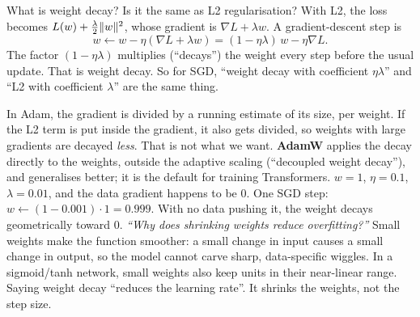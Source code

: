 \begin{qa}{ What is weight decay? Is it the same as L2 regularisation?}
\why
With L2, the loss becomes $L(w) + \frac{\lambda}{2}\lVert w\rVert^2$, whose gradient is $\nabla L + \lambda w$. A
gradient-descent step is
\[ w \leftarrow w - \eta(\nabla L + \lambda w) = (1-\eta\lambda)\,w - \eta \nabla L. \]
The factor $(1-\eta\lambda)$ multiplies (``decays'') the weight every step before the usual update. That is
weight decay. So for SGD, ``weight decay with coefficient $\eta\lambda$'' and ``L2 with coefficient $\lambda$''
are the same thing.

In Adam, the gradient is divided by a running estimate of its size, per weight. If the L2 term is put
inside the gradient, it also gets divided, so weights with large gradients are decayed \emph{less}. That is not
what we want. \textbf{AdamW} applies the decay directly to the weights, outside the adaptive scaling
(``decoupled weight decay''), and generalises better; it is the default for training Transformers.
\worked $w = 1$, $\eta = 0.1$, $\lambda = 0.01$, and the data gradient happens to be 0. One SGD step: $w \leftarrow
(1 - 0.001)\cdot 1 = 0.999$. With no data pushing it, the weight decays geometrically toward 0.
\pushes \emph{``Why does shrinking weights reduce overfitting?''} Small weights make the function smoother: a
small change in input causes a small change in output, so the model cannot carve sharp, data-specific
wiggles. In a sigmoid/tanh network, small weights also keep units in their near-linear range.
\pitfall Saying weight decay ``reduces the learning rate''. It shrinks the weights, not the step size.
\end{qa}

